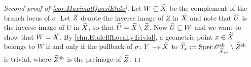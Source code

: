\documentclass[12pt]{amsart}
\numberwithin{equation}{theorem}
\renewcommand{\:}{\colon}
\theoremstyle{theorem}
\renewcommand{\O}{\mathscr O}
\begin{document}
\begin{proof} [Second proof of \autoref{cor.MaximalQuasiEtale}]
Let $W \subseteq \widetilde X$ be the complement of the branch locus of $\sigma$. Let $\widetilde Z$ denote the inverse image of $Z$ in $\widetilde X$ and note that $\widetilde U$ is the inverse image of $U$ in $\widetilde X$, so that $\widetilde U = \widetilde X \setminus \widetilde Z$.
Now $\widetilde U \subseteq W$ and we want to show that $W = \widetilde X$. %
By \autoref{clm.EtaleIffLocallyTrivial}, a geometric point $x \in \widetilde X$ belongs to $W$ if and only if the pullback of $\sigma\colon Y \xrightarrow{\ \ } \widetilde X$ to $\tld T_x := \Spec \O_{\tld X, x}^{\sh} \setminus \tld{Z}^{\sh}$ is trivial, where $\widetilde Z^{\textnormal{sh}}$ is the preimage of $\widetilde Z$.


\end{proof}
\end{document}
